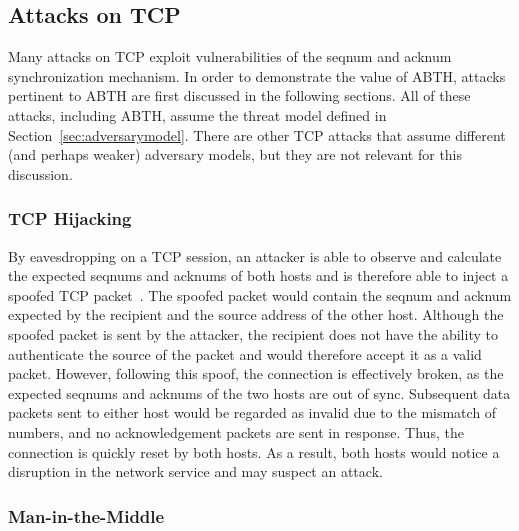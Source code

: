 \documentclass{sig-alternate}
\begin{document}
\subsection{Attacks on TCP}

Many attacks on TCP exploit vulnerabilities of the seqnum and acknum synchronization mechanism.
In order to demonstrate the value of ABTH, attacks pertinent to ABTH are first discussed in the following sections.
All of these attacks, including ABTH, assume the threat model defined in Section~\ref{sec:adversarymodel}.
There are other TCP attacks that assume different (and perhaps weaker) adversary models, but they are not relevant for this discussion.

\subsubsection{TCP Hijacking}

By eavesdropping on a TCP session, an attacker is able to observe and calculate the expected seqnums and acknums of both hosts and is therefore able to inject a spoofed TCP packet~\cite{harris:tcpattacks}.
The spoofed packet would contain the seqnum and acknum expected by the recipient and the source address of the other host.
Although the spoofed packet is sent by the attacker, the recipient does not have the ability to authenticate the source of the packet and would therefore accept it as a valid packet.
However, following this spoof, the connection is effectively broken, as the expected seqnums and acknums of the two hosts are out of sync.
Subsequent data packets sent to either host would be regarded as invalid due to the mismatch of numbers, and no acknowledgement packets are sent in response.
Thus, the connection is quickly reset by both hosts.
As a result, both hosts would notice a disruption in the network service and may suspect an attack.

\subsubsection{Man-in-the-Middle}
\end{document}
